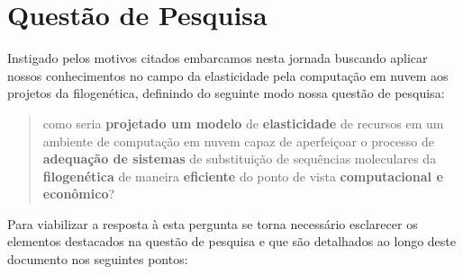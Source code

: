 \documentclass[english,brazilian]{UNISINOSmonografia} %
\begin{document}
\section{Questão de Pesquisa} %

Instigado pelos motivos citados embarcamos nesta jornada buscando aplicar nossos conhecimentos no campo da elasticidade pela computação em nuvem aos projetos da filogenética, definindo do seguinte modo nossa questão de pesquisa:


\begin{quote}
	\large
	como seria \textbf{projetado um modelo} de \textbf{elasticidade} de recursos em um ambiente de computação em nuvem capaz de aperfeiçoar o processo de \textbf{adequação de sistemas} de substituição de sequências moleculares da \textbf{filogenética} de maneira \textbf{eficiente} do ponto de vista \textbf{computacional e econômico}?
	
\end{quote}


Para viabilizar a resposta à esta pergunta se torna necessário esclarecer os elementos destacados na questão de pesquisa e que são detalhados ao longo deste documento nos seguintes pontos:
\end{document}
